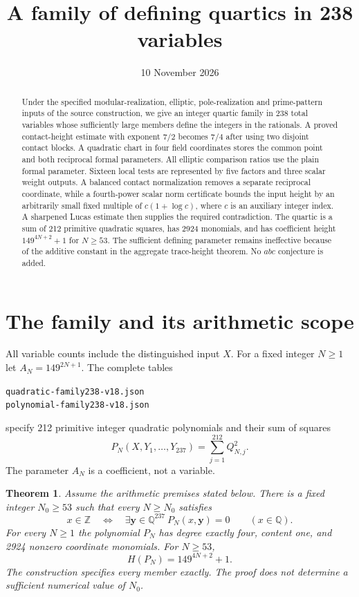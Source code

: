 \documentclass[11pt,a4paper]{article}
\title{A family of defining quartics in 238 variables}
\author{}\date{10 November 2026}
\newtheorem{theorem}{Theorem}[section]\newtheorem{lemma}[theorem]{Lemma}
\newcommand{\Q}{\mathbb Q}\newcommand{\Z}{\mathbb Z}\newcommand{\HH}{\mathcal H}
\begin{document}
\maketitle
\begin{abstract}
Under the specified modular-realization, elliptic, pole-realization and
prime-pattern inputs of the source construction, we give an integer
quartic family in 238 total variables whose sufficiently large members
define the integers in the rationals. A proved contact-height estimate
with exponent $7/2$ becomes $7/4$ after using two disjoint contact blocks.
A quadratic chart in four field coordinates stores the common point
and both reciprocal formal parameters. All elliptic comparison ratios
use the plain formal parameter. Sixteen
local tests are represented by five factors and three scalar weight
outputs. A balanced contact normalization removes a separate reciprocal
coordinate, while a fourth-power scalar norm certificate bounds the
input height by an arbitrarily small fixed multiple of $c(1+\log c)$,
where $c$ is an auxiliary integer index. A sharpened Lucas estimate
then supplies the required contradiction.
The quartic is a sum of 212 primitive quadratic squares, has 2924
monomials, and has coefficient height $149^{4N+2}+1$ for $N\ge53$.
The sufficient defining parameter remains ineffective because of the
additive constant in the aggregate trace-height theorem. No $abc$
conjecture is added.
\end{abstract}

\section{The family and its arithmetic scope}
All variable counts include the distinguished input $X$. For a fixed
integer $N\ge1$ let $A_N=149^{2N+1}$. The complete tables
\begin{center}\small
\nolinkurl{quadratic-family238-v18.json}\\
\nolinkurl{polynomial-family238-v18.json}
\end{center}
specify 212 primitive integer
quadratic polynomials and their sum of squares
\[
 P_N(X,Y_1,\ldots,Y_{237})=\sum_{j=1}^{212}Q_{N,j}^2.
\]
The parameter $A_N$ is a coefficient, not a variable.

\begin{theorem}\label{thm:main}
Assume the arithmetic premises stated below. There is a fixed integer
$N_0\ge53$ such that every $N\ge N_0$ satisfies
\[
 x\in\Z\quad\Longleftrightarrow\quad
 \exists\mathbf y\in\Q^{237}\ P_N(x,\mathbf y)=0
 \qquad(x\in\Q).
\]
For every $N\ge1$ the polynomial $P_N$ has degree exactly four,
content one, and 2924 nonzero coordinate monomials. For $N\ge53$,
\[
                       H(P_N)=149^{4N+2}+1.
\]
The construction specifies every member exactly. The proof does not
determine a sufficient numerical value of $N_0$.
\end{theorem}
\end{document}
